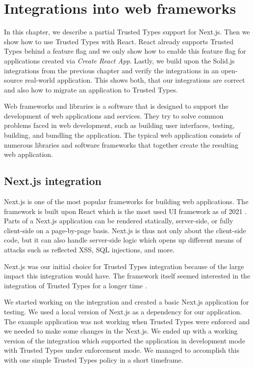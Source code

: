 \chapter{Integrations into web frameworks}

In this chapter, we describe a partial Trusted Types support for Next.js. Then we show how to use
Trusted Types with React. React already supports Trusted Types behind a feature flag and we only
show how to enable this feature flag for applications created via \emph{Create React App}. Lastly,
we build upon the Solid.js integrations from the previous chapter and verify the integrations in an
open-source real-world application. This shows both, that our integrations are correct and also how
to migrate an application to Trusted Types.

Web frameworks and libraries is a software that is designed to support the development of web
applications and services. They try to solve common problems faced in web development, such as
building user interfaces, testing, building, and bundling the application. The typical web
application consists of numerous libraries and software frameworks that together create the
resulting web application.

\section{Next.js integration}
\label{intro-nextjs}

Next.js is one of the most popular frameworks for building web applications. The framework is built
upon React which is the most used UI framework as of 2021 \cite{react_most_used_2021}. Parts of a
Next.js application can be rendered statically, server-side, or fully client-side on a page-by-page
basis. Next.js is thus not only about the client-side code, but it can also handle server-side logic
which opens up different means of attacks such as reflected XSS, SQL injections, and more.

Next.js was our initial choice for Trusted Types integration because of the large impact this
integration would have. The framework itself seemed interested in the integration of Trusted Types
for a longer time \cite{nextjs_tt_pr_2020}.

We started working on the integration and created a basic Next.js application for testing. We used a
local version of Next.js as a dependency for our application. The example application was not
working when Trusted Types were enforced and we needed to make some changes in the Next.js. We ended
up with a working version of the integration which supported the application in development mode
with Trusted Types under enforcement mode. We managed to accomplish this with one simple Trusted
Types policy in a short timeframe.

